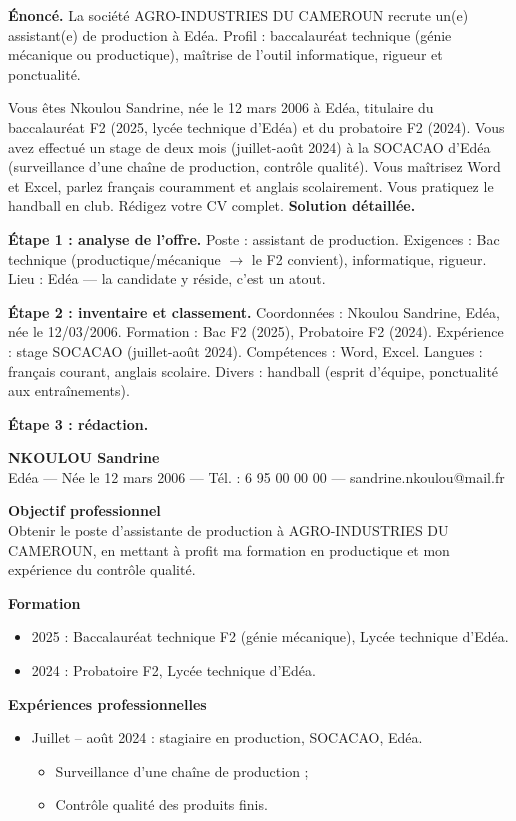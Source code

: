 \documentclass[11pt]{article}
\begin{document}
\begin{exoresolu}
\textbf{Énoncé.} La société AGRO-INDUSTRIES DU CAMEROUN recrute un(e) assistant(e) de production à Edéa. Profil : baccalauréat technique (génie mécanique ou productique), maîtrise de l'outil informatique, rigueur et ponctualité.

Vous êtes Nkoulou Sandrine, née le 12 mars 2006 à Edéa, titulaire du baccalauréat F2 (2025, lycée technique d'Edéa) et du probatoire F2 (2024). Vous avez effectué un stage de deux mois (juillet-août 2024) à la SOCACAO d'Edéa (surveillance d'une chaîne de production, contrôle qualité). Vous maîtrisez Word et Excel, parlez français couramment et anglais scolairement. Vous pratiquez le handball en club. Rédigez votre CV complet.
\tcblower
\textbf{Solution détaillée.}

\textbf{Étape 1 : analyse de l'offre.} Poste : assistant de production. Exigences : Bac technique (productique/mécanique $\rightarrow$ le F2 convient), informatique, rigueur. Lieu : Edéa — la candidate y réside, c'est un atout.

\textbf{Étape 2 : inventaire et classement.} Coordonnées : Nkoulou Sandrine, Edéa, née le 12/03/2006. Formation : Bac F2 (2025), Probatoire F2 (2024). Expérience : stage SOCACAO (juillet-août 2024). Compétences : Word, Excel. Langues : français courant, anglais scolaire. Divers : handball (esprit d'équipe, ponctualité aux entraînements).

\textbf{Étape 3 : rédaction.}

\begin{center}
\textbf{NKOULOU Sandrine}\\
Edéa — Née le 12 mars 2006 — Tél. : 6 95 00 00 00 — sandrine.nkoulou@mail.fr
\end{center}

\textbf{Objectif professionnel}\\
Obtenir le poste d'assistante de production à AGRO-INDUSTRIES DU CAMEROUN, en mettant à profit ma formation en productique et mon expérience du contrôle qualité.

\textbf{Formation}
\begin{itemize}
\item 2025 : Baccalauréat technique F2 (génie mécanique), Lycée technique d'Edéa.
\item 2024 : Probatoire F2, Lycée technique d'Edéa.
\end{itemize}

\textbf{Expériences professionnelles}
\begin{itemize}
\item Juillet -- août 2024 : stagiaire en production, SOCACAO, Edéa.
\begin{itemize}
\item Surveillance d'une chaîne de production ;
\item Contrôle qualité des produits finis.
\end{itemize}
\end{itemize}


\end{exoresolu}
\end{document}
